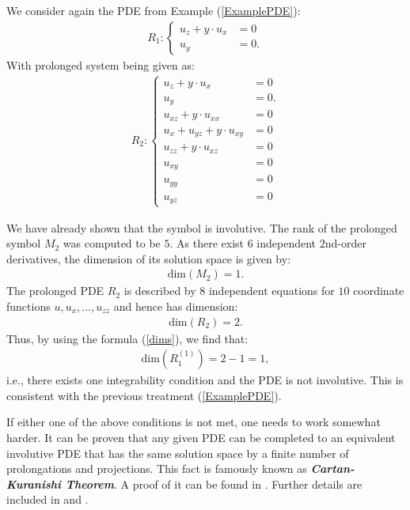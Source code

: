 \begin{example}
We consider again the PDE from Example (\ref{ExamplePDE}):
\begin{align}
    R_1 : \begin{cases} u_z + y \cdot u_x &= 0\\
                        u_y &= 0.
            \end{cases}
\end{align}
With prolonged system being given as:
\begin{align}
    R_2 : \begin{cases} u_z + y \cdot u_x &= 0 \\
                        u_y &= 0. \\
                        u_{xz} + y \cdot u_{xx} &= 0 \\
                        u_x + u_{yz} + y \cdot u_{xy} &= 0 \\
                        u_{zz} + y \cdot u_{xz} &= 0 \\
                        u_{xy} &= 0 \\
                        u_{yy} &= 0 \\
                        u_{yz} &= 0 
            \end{cases}
\end{align}

We have already shown that the symbol is involutive. 
The rank of the prolonged symbol $M_2$ was computed to be $5$. As there exist $6$ independent $2$nd-order derivatives, the dimension of its solution space is given by:
\begin{align}
    \mathrm{dim}(M_2) = 1.
\end{align}
The prolonged PDE $R_2$ is described by $8$ independent equations for $10$ coordinate functions $u,u_x,...,u_{zz}$ and hence has dimension:
\begin{align}
    \mathrm{dim}(R_2) = 2.
\end{align}
Thus, by using the formula (\ref{dims}), we find that:
\begin{align}
    \mathrm{dim}(R_1^{(1)}) = 2 - 1 = 1,
\end{align}
i.e., there exists one integrability condition and the PDE is not involutive. This is consistent with the previous treatment (\ref{ExamplePDE}).
\end{example}


If either one of the above conditions is not met, one needs to work somewhat harder. It can be proven that any given PDE can be completed to an equivalent involutive PDE that has the same solution space by a finite number of prolongations and projections. This fact is famously known as \textbf{\textit{Cartan-Kuranishi Theorem}}. A proof of it can be found in \cite{sweeney1968}. Further details are included in \cite{seiler2009involution} and \cite{seiler1994analysis}.

